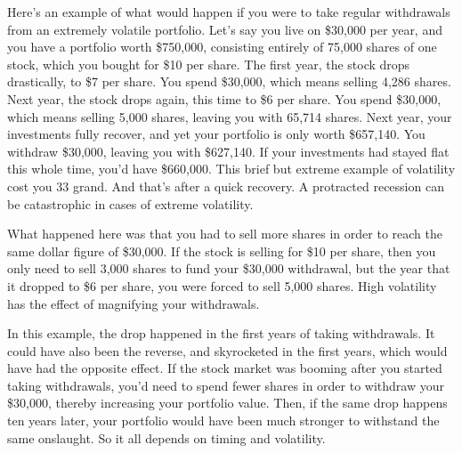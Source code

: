 Here's an example of what would happen if you were to take regular withdrawals from an extremely volatile portfolio. Let's say you live on \$30,000 per year, and you have a portfolio worth \$750,000, consisting entirely of 75,000 shares of one stock, which you bought for \$10 per share. The first year, the stock drops drastically, to \$7 per share. You spend \$30,000, which means selling 4,286 shares. Next year, the stock drops again, this time to \$6 per share. You spend \$30,000, which means selling 5,000 shares, leaving you with 65,714 shares. Next year, your investments fully recover, and yet your portfolio is only worth \$657,140. You withdraw \$30,000, leaving you with \$627,140. If your investments had stayed flat this whole time, you'd have \$660,000. This brief but extreme example of volatility cost you 33 grand. And that's after a quick recovery. A protracted recession can be catastrophic in cases of extreme volatility.

\begin{figure}
\centering
{}
\end{figure}

What happened here was that you had to sell more shares in order to reach the same dollar figure of \$30,000. If the stock is selling for \$10 per share, then you only need to sell 3,000 shares to fund your \$30,000 withdrawal, but the year that it dropped to \$6 per share, you were forced to sell 5,000 shares. High volatility has the effect of magnifying your withdrawals.

In this example, the drop happened in the first years of taking withdrawals. It could have also been the reverse, and skyrocketed in the first years, which would have had the opposite effect. If the stock market was booming after you started taking withdrawals, you'd need to spend fewer shares in order to withdraw your \$30,000, thereby increasing your portfolio value. Then, if the same drop happens ten years later, your portfolio would have been much stronger to withstand the same onslaught. So it all depends on timing and volatility.

